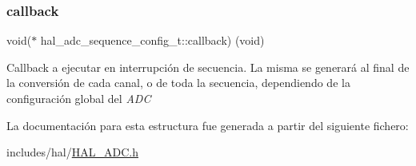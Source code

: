 \subsubsection{\texorpdfstring{callback}{callback}}
{\footnotesize\ttfamily void($\ast$ hal\+\_\+adc\+\_\+sequence\+\_\+config\+\_\+t\+::callback) (void)}

Callback a ejecutar en interrupción de secuencia. La misma se generará al final de la conversión de cada canal, o de toda la secuencia, dependiendo de la configuración global del {\itshape A\+DC} 

La documentación para esta estructura fue generada a partir del siguiente fichero\+:\begin{DoxyCompactItemize}
\item 
includes/hal/\hyperlink{HAL__ADC_8h}{H\+A\+L\+\_\+\+A\+D\+C.\+h}\end{DoxyCompactItemize}
